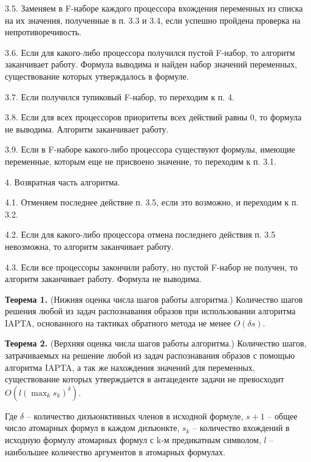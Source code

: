 \documentclass{spisok-article}
\begin{document}
\hspace*{12pt} 3.5. Заменяем в  F-наборе каждого процессора вхождения переменных из списка  на их значения, полученные в п. 3.3 и 3.4, если успешно пройдена проверка на непротиворечивость.

\hspace*{12pt} 3.6. Если для какого-либо процессора получился пустой F-набор, то алгоритм заканчивает работу. Формула выводима и найден набор значений переменных, существование которых утверждалось в формуле.

\hspace*{12pt} 3.7. Если получился тупиковый F-набор, то переходим к п. 4.

\hspace*{12pt} 3.8. Если для всех процессоров приоритеты всех действий равны 0, то формула не выводима. Алгоритм заканчивает работу.

\hspace*{12pt} 3.9. Если в F-наборе какого-либо процессора существуют формулы, имеющие переменные, которым еще не присвоено значение, то переходим к п. 3.1.

4. Возвратная часть алгоритма.

\hspace*{12pt} 4.1. Отменяем последнее действие п. 3.5, если это возможно, и переходим к п. 3.2.

\hspace*{12pt} 4.2. Если для какого-либо процессора отмена последнего действия п. 3.5 невозможна, то алгоритм заканчивает работу.\

\vbox{\hspace*{12pt} 4.3. Если все процессоры закончили работу, но пустой F-набор не получен, то алгоритм заканчивает работу. Формула не выводима.}


{\bf Теорема 1.} (Нижняя оценка числа шагов работы алгоритма.) Количество шагов решения любой из задач распознавания образов при использовании алгоритма IAPTA, основанного на тактиках обратного метода не менее $O(\delta s)$.


{\bf Теорема 2.} (Верхняя оценка числа шагов работы алгоритма.) Количество шагов, затрачиваемых на решение любой из задач распознавания образов с помощью алгоритма IAPTA, а так же нахождения значений для переменных, существование которых утверждается в антацеденте задачи не превосходит $O(l(\max_k s_k)^{\delta})$.


Где $\delta$ – количество дизъюнктивных членов в исходной формуле, $s+1$ – общее число атомарных формул в каждом дизъюнкте, $s_k$  – количество вхождений в исходную формулу атомарных формул с k-м предикатным символом, $l$ – наибольшее количество аргументов в атомарных формулах.
\end{document}
